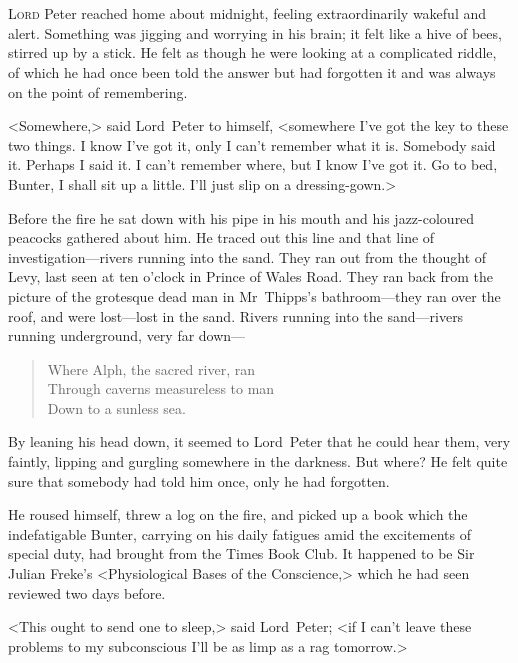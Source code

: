 \chapter[Chapter \thechapter]{}
\lettrine[lines=4]{L}{ord} Peter reached home about midnight, feeling extraordinarily wakeful and alert. Something was jigging and worrying in his brain; it felt like a hive of bees, stirred up by a stick. He felt as though he were looking at a complicated riddle, of which he had once been told the answer but had forgotten it and was always on the point of remembering.

<Somewhere,> said Lord~Peter to himself, <somewhere I've got the key to these two things. I know I've got it, only I can't remember what it is. Somebody said it. Perhaps I said it. I can't remember where, but I know I've got it. Go to bed, Bunter, I shall sit up a little. I'll just slip on a dressing-gown.>

Before the fire he sat down with his pipe in his mouth and his jazz-coloured peacocks gathered about him. He traced out this line and that line of investigation—rivers running into the sand. They ran out from the thought of Levy, last seen at ten o'clock in Prince of Wales Road. They ran back from the picture of the grotesque dead man in Mr~Thipps's bathroom—they ran over the roof, and were lost—lost in the sand. Rivers running into the sand—rivers running underground, very far down—

\begin{verse}
Where Alph, the sacred river, ran\\
Through caverns measureless to man\\
Down to a sunless sea.\\
\end{verse}


By leaning his head down, it seemed to Lord~Peter that he could hear them, very faintly, lipping and gurgling somewhere in the darkness. But where? He felt quite sure that somebody had told him once, only he had forgotten.

He roused himself, threw a log on the fire, and picked up a book which the indefatigable Bunter, carrying on his daily fatigues amid the excitements of special duty, had brought from the Times Book Club. It happened to be Sir Julian Freke's <Physiological Bases of the Conscience,> which he had seen reviewed two days before.

<This ought to send one to sleep,> said Lord~Peter; <if I can't leave these problems to my subconscious I'll be as limp as a rag tomorrow.>

